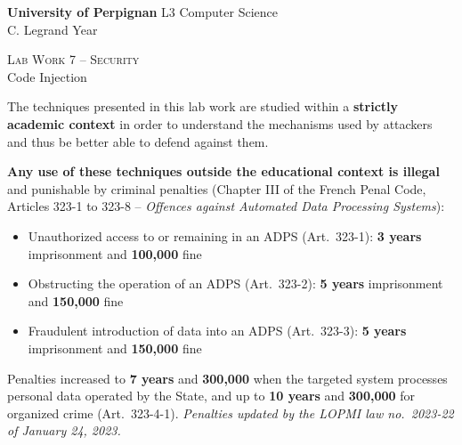 \documentclass[a4paper,11pt]{article}
\theoremstyle{plain}
\theoremstyle{definition}
\begin{document}
\hbox{}
\noindent \textbf{University of Perpignan} \hfill  L3 Computer Science \\
 \hfill C. Legrand \hfill  Year \the\year \\
\smallskip
\begin{center}
{
  {\scshape \large Lab Work 7 -- Security}  \\
 Code Injection
}
\end{center}
\hbox{}

\bigskip

\begin{ethique}
The techniques presented in this lab work are studied within a \textbf{strictly academic context} in order to understand the mechanisms used by attackers and thus be better able to defend against them.

\textbf{Any use of these techniques outside the educational context is illegal} and punishable by criminal penalties (Chapter III of the French Penal Code, Articles 323-1 to 323-8 -- \textit{Offences against Automated Data Processing Systems}):
\begin{itemize}
    \item Unauthorized access to or remaining in an ADPS (Art.~323-1): \textbf{3 years} imprisonment and \textbf{\texteuro{}100,000} fine
    \item Obstructing the operation of an ADPS (Art.~323-2): \textbf{5 years} imprisonment and \textbf{\texteuro{}150,000} fine
    \item Fraudulent introduction of data into an ADPS (Art.~323-3): \textbf{5 years} imprisonment and \textbf{\texteuro{}150,000} fine
\end{itemize}
Penalties increased to \textbf{7 years} and \textbf{\texteuro{}300,000} when the targeted system processes personal data operated by the State, and up to \textbf{10 years} and \textbf{\texteuro{}300,000} for organized crime (Art.~323-4-1). \textit{Penalties updated by the LOPMI law no.~2023-22 of January 24, 2023.}
\end{ethique}

\bigskip
\end{document}
